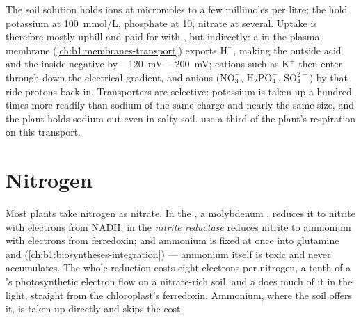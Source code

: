 \begin{proposition}\label{prop:b1:plant-water-minerals:uptake}
The soil solution holds ions at micromoles to a few millimoles per
litre; the   hold potassium at \qty{100}{mmol/L}, phosphate
at \qty{10}{}, nitrate at several. Uptake is therefore mostly uphill
and paid for with , but indirectly: a \emph{} in the
plasma membrane (\cref{ch:b1:membranes-transport}) exports
$\mathrm{H^+}$, making the outside acid and the inside negative by
\qtyrange{-120}{-200}{mV}; cations such as $\mathrm{K^+}$ then enter
through  down the electrical gradient, and anions
($\mathrm{NO_3^-}$, $\mathrm{H_2PO_4^-}$, $\mathrm{SO_4^{2-}}$) by
 that ride protons back in. Transporters are selective:
potassium is taken up a hundred times more readily than sodium of the
same charge and nearly the same size, and the plant holds sodium out
even in salty soil.  use a third of the plant's respiration on
this transport.
\end{proposition}

\section{Nitrogen}

\begin{proposition}\label{prop:b1:plant-water-minerals:nitrate}
Most plants take nitrogen as nitrate. In the  \emph{}, a molybdenum , reduces it to nitrite with electrons
from NADH; in the  \emph{nitrite reductase} reduces nitrite to
ammonium with electrons from ferredoxin; and ammonium is fixed at
once into glutamine and  (\cref{ch:b1:biosyntheses-integration})
--- ammonium itself is toxic and never accumulates. The whole reduction
costs eight electrons per nitrogen, a tenth of a 's photosynthetic
electron flow on a nitrate-rich soil, and a  does much of it in
the light, straight from the chloroplast's ferredoxin. Ammonium, where
the soil offers it, is taken up directly and skips the cost.
\end{proposition}

